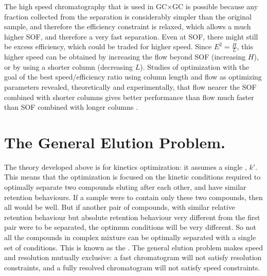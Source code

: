 The high speed chromatography that is used in GC×GC is possible because any
fraction collected from the \oneD separation is considerably simpler than the
original sample, and therefore the efficiency constraint is relaxed, which
allows a much higher SOF, and therefore a very fast \twoD separation. Even at
SOF, there might still be excess efficiency, which could be traded for higher
speed. Since \(E^2 = \frac{H}{L} \), this higher speed can be obtained by
increasing the flow beyond SOF (increasing \(H\)), or by using a shorter column
(decreasing \(L\)). Studies of optimization with the goal of the best
speed/efficiency ratio using column length and flow as optimizing parameters
revealed, theoretically and experimentally, that flow nearer the SOF combined
with shorter columns gives better performance than flow much faster than SOF
combined with longer columns \autocite{Klee2002, Reed1999}.

\section{The General Elution Problem.}

The theory developed above is for kinetics optimization: it assumes a single
, \(k'\). This means that the optimization is focused
on the kinetic conditions required to optimally separate two compounds eluting
after each other, and have similar retention behaviours. If a sample were to
contain only these two compounds, then all would be well. But if another pair of
compounds, with similar relative retention behaviour but absolute retention behaviour
very different from the first pair were to be separated, the optimum conditions
will be very different. So not all the compounds in complex mixture can be
optimally separated with a single set of conditions. This is known as the
 \autocite[p. 779]{Skoog2007}. The general
elution problem makes speed and resolution mutually exclusive: a fast
chromatogram will not satisfy resolution constraints, and a fully resolved
chromatogram will not satisfy speed constraints.

